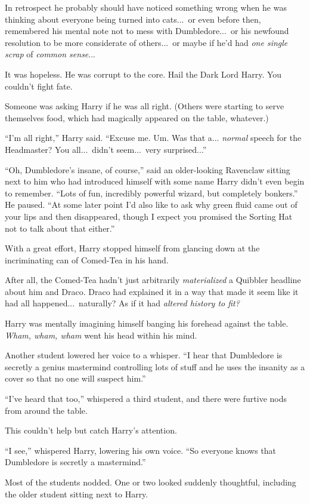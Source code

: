 In retrospect he probably should have noticed something wrong when he was thinking about everyone being turned into cats...\ or even before then, remembered his mental note not to mess with Dumbledore...\ or his newfound resolution to be more considerate of others...\ or maybe if he’d had \emph{one single scrap} of \emph{common sense}...

It was hopeless. He was corrupt to the core. Hail the Dark Lord Harry. You couldn’t fight fate.

Someone was asking Harry if he was all right. (Others were starting to serve themselves food, which had magically appeared on the table, whatever.)

“I’m all right,” Harry said. “Excuse me. Um. Was that a... \emph{normal} speech for the Headmaster? You all...\ didn’t seem...\ very surprised...”

“Oh, Dumbledore’s insane, of course,” said an older-looking Ravenclaw sitting next to him who had introduced himself with some name Harry didn’t even begin to remember. “Lots of fun, incredibly powerful wizard, but completely bonkers.” He paused. “At some later point I’d also like to ask why green fluid came out of your lips and then disappeared, though I expect you promised the Sorting Hat not to talk about that either.”

With a great effort, Harry stopped himself from glancing down at the incriminating can of Comed-Tea in his hand.

After all, the Comed-Tea hadn’t just arbitrarily \emph{materialized} a Quibbler headline about him and Draco. Draco had explained it in a way that made it seem like it had all happened...\ naturally? As if it had \emph{altered history to fit?}

Harry was mentally imagining himself banging his forehead against the table. \emph{Wham, wham, wham} went his head within his mind.

Another student lowered her voice to a whisper. “I hear that Dumbledore is secretly a genius mastermind controlling lots of stuff and he uses the insanity as a cover so that no one will suspect him.”

“I’ve heard that too,” whispered a third student, and there were furtive nods from around the table.

This couldn’t help but catch Harry’s attention.

“I see,” whispered Harry, lowering his own voice. “So everyone knows that Dumbledore is secretly a mastermind.”

Most of the students nodded. One or two looked suddenly thoughtful, including the older student sitting next to Harry.

